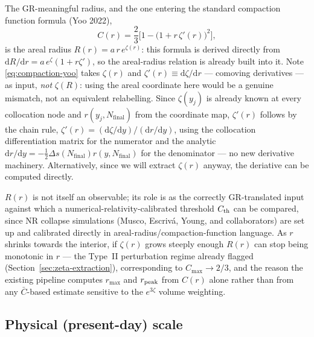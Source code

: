 \documentclass[a4paper,11pt]{article}
\renewcommand{\d}{\mathrm{d}}
\newcommand{\Nfinal}{N_{\mathrm{final}}}     %
\newcommand{\rad}{r}                         %
\newcommand{\yco}{y}                         %
\newcommand{\Deltas}{\Delta s}                %
\newcommand{\zprofile}{\zeta}                %
\begin{document}
The GR-meaningful radius, and the one entering the standard compaction
function formula (Yoo 2022),
\begin{equation}
    C(\rad) = \frac23\Big[1-\big(1+\rad\,\zprofile'(\rad)\big)^2\Big] ,
    \label{eq:compaction-yoo}
\end{equation}
is the areal radius $R(\rad) = a\,\rad\,e^{\zprofile(\rad)}$: this formula
is derived directly from $\d R/\d\rad = a\,e^{\zprofile}(1+\rad\zprofile')$,
so the areal-radius relation is already built into it. Note
\eqref{eq:compaction-yoo} takes $\zprofile(\rad)$ and
$\zprofile'(\rad)\equiv\d\zprofile/\d\rad$ --- comoving derivatives --- as
input, \emph{not} $\zprofile(R)$: using the areal coordinate here would be
a genuine mismatch, not an equivalent relabelling. Since
$\zprofile(\yco_j)$ is already known at every collocation node and
$\rad(\yco_j,\Nfinal)$ from the coordinate map, $\zprofile'(\rad)$ follows
by the chain rule, $\zprofile'(\rad) = (\d\zprofile/\d\yco)/(\d\rad/\d\yco)$,
using the collocation differentiation matrix for the numerator and the
analytic $\d\rad/\d\yco=-\tfrac12\Deltas(\Nfinal)\rad(\yco,\Nfinal)$ for the
denominator --- no new derivative machinery.
Alternatively, since we will extract $\zeta(r)$ anyway, the
deriative can be computed directly.

$R(\rad)$ is not itself an observable; its role is as the correctly
GR-translated input against which a numerical-relativity-calibrated
threshold $C_{\rm th}$ can be compared, since NR collapse simulations
(Musco, Escriv\'a, Young, and collaborators) are set up and calibrated
directly in areal-radius/compaction-function language. As $\rad$ shrinks
towards the interior, if $\zprofile(\rad)$ grows steeply enough $R(\rad)$
can stop being monotonic in $\rad$ --- the Type~II perturbation regime
already flagged (Section~\ref{sec:zeta-extraction}), corresponding to
$C_{\max}\to2/3$, and the reason the existing pipeline computes $r_{\max}$
and $r_{\rm peak}$ from $C(\rad)$ alone rather than from any
$\bar C$-based estimate sensitive to the $e^{3\zprofile}$ volume
weighting.

\subsection{Physical (present-day) scale}
\end{document}
